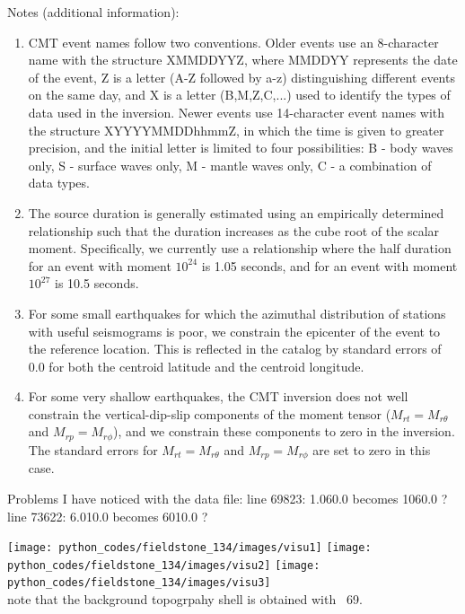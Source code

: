         
Notes (additional information):
\begin{enumerate}
\item CMT event names follow two conventions. Older events use an 8-character 
name with the structure XMMDDYYZ, where MMDDYY represents the date of
the event, Z is a letter (A-Z followed by a-z) distinguishing different 
events on the same day, and X is a letter (B,M,Z,C,...) used to identify 
the types of data used in the inversion. Newer events use 14-character event 
names with the structure XYYYYMMDDhhmmZ, in which the time is given to greater
precision, and the initial letter is limited to four possibilities: B - body 
waves only, S - surface waves only, M - mantle waves only, C - a combination 
of data types.

\item The source duration is generally estimated using an empirically determined
relationship such that the duration increases as the cube root of the scalar
moment. Specifically, we currently use a relationship where the half duration
for an event with moment $10^{24}$ is 1.05 seconds, and for an event with moment
$10^{27}$ is 10.5 seconds.

\item For some small earthquakes for which the azimuthal distribution of stations 
with useful seismograms is poor, we constrain the epicenter of the event to
the reference location. This is reflected in the catalog by standard 
errors of 0.0 for both the centroid latitude and the centroid longitude.

\item For some very shallow earthquakes, the CMT inversion does not well 
constrain the vertical-dip-slip components of the moment tensor ($M_{rt}=M_{r\theta}$ and $M_{rp}=M_{r\phi}$),
and we constrain these components to zero in the inversion. The standard
errors for $M_{rt}=M_{r\theta}$ and $M_{rp}=M_{r\phi}$ are set to zero in this case.
\end{enumerate}

\vspace{1cm}

Problems I have noticed with the data file:
line 69823: 1.060.0 becomes 1060.0 ?
line 73622: 6.010.0 becomes 6010.0 ? 


\begin{center}
\texttt{[image: python\_codes/fieldstone\_134/images/visu1]}
\texttt{[image: python\_codes/fieldstone\_134/images/visu2]}
\texttt{[image: python\_codes/fieldstone\_134/images/visu3]}\\
{\captionfont note that the background topogrpahy shell is obtained 
with \stone~69.}
\end{center}

